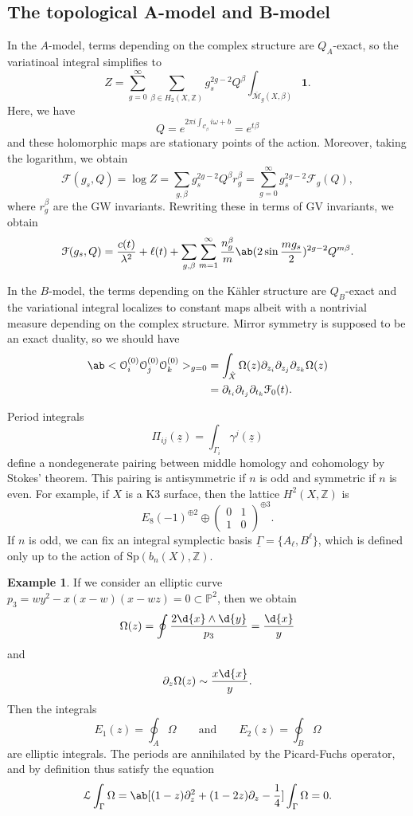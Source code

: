 \documentclass[10pt]{amsart}
\theoremstyle{definition}
\newtheorem{exm}[thm]{Example}
\theoremstyle{remark}
\theoremstyle{plain}
\theoremstyle{definition}
\theoremstyle{remark}
\newcommand{\Z}{\mathbb{Z}}
\renewcommand{\P}{\mathbb{P}}
\newcommand{\Mbar}{\overline{\mathcal{M}}}
\newcommand{\mc}[1]{\mathcal{#1}}
\newcommand{\uz}{\ul{z}}
\newcommand{\mr}[1]{\mathrm{#1}}
\newcommand{\ul}[1]{\underline{#1}}
\newcommand{\1}{\mathbf{1}}
\newcommand{\2}{\mathbf{2}}
\newcommand{\3}{\mathbf{3}}
\begin{document}
\subsection{The topological A-model and B-model}%
\label{sub:The topological A-model}

In the $A$-model, terms depending on the complex structure are $Q_A$-exact, so the variatinoal integral simplifies to
\[ Z = \sum_{g=0}^{\infty} \sum_{\beta \in H_2(X,\Z)} g_s^{2g-2} Q^{\beta} \int_{\Mbar_g(X,\beta)} \1. \]
Here, we have
\[ Q = e^{2\pi i \int_{\mc{C}_{\beta}}i\omega+b} = e^{t\beta} \]
and these holomorphic maps are stationary points of the action. Moreover, taking the logarithm, we obtain
\[ \mc{F}(g_s, Q) = \log Z = \sum_{g,\beta} g_s^{2g-2} Q^{\beta} r_g^{\beta} = \sum_{g=0}^{\infty} g_s^{2g-2} \mc{F}_g(Q), \]
where $r_g^{\beta}$ are the GW invariants.
Rewriting these in terms of GV invariants, we obtain
\[ \mc{F}(g_s, Q) = \frac{c(t)}{\lambda^2} + \ell(t) + \sum_{g,\beta} \sum_{m=1}^{\infty} \frac{n_g^{\beta}}{m}\ab(2 \sin \frac{m g_s}{2})^{2g-2} Q^{m\beta}. \]


In the $B$-model, the terms depending on the K\"ahler structure are $Q_B$-exact and the variational integral localizes to constant maps albeit with a nontrivial measure depending on the complex structure. Mirror symmetry is supposed to be an exact duality, so we should have
\begin{align*}
    \ab<\mc{O}_i^{(0)} \mc{O}_j^{(0)} \mc{O}_k^{(0)}>_{g=0} &= \int_{\hat{X}} \Omega(z) \partial_{z_i} \partial_{z_j} \partial_{z_k} \Omega(z) \\
    &= \partial_{t_i} \partial_{t_j} \partial_{t_k} \mc{F}_0(t).
\end{align*}

Period integrals
\[ \Pi_{ij}(\uz) = \int_{\Gamma_i} \gamma^j(\uz) \]
define a nondegenerate pairing between middle homology and cohomology by Stokes' theorem. This pairing is antisymmetric if $n$ is odd and symmetric if $n$ is even. For example, if $X$ is a K3 surface, then the lattice $H^2(X,\Z)$ is
\[ E_8(-1)^{\oplus 2} \oplus \begin{pmatrix}
    0 & 1 \\
    1 & 0
\end{pmatrix}^{\oplus 3}.
\]
If $n$ is odd, we can fix an integral symplectic basis $\ul{\Gamma} = \{A_{\ell}, B^{\ell}\}$, which is defined only up to the action of $\mr{Sp}(b_n(X), \Z)$.

\begin{exm}
    If we consider an elliptic curve $p_3 = wy^2-x(x-w)(x-wz) = 0 \subset \P^2$, then we obtain
    \[ \Omega(z) = \oint \frac{2 \d{x} \wedge \d{y}}{p_3} = \frac{\d{x}}{y} \]
    and
    \[ \partial_z \Omega(z) \sim \frac{x\d{x}}{y}. \]
    Then the integrals 
    \[ E_1(z) = \oint_A \Omega \qquad \text{and} \qquad E_2(z) = \oint_B \Omega \]
    are elliptic integrals. The periods are annihilated by the Picard-Fuchs operator, and by definition thus satisfy the equation
    \[ \mc{L} \int_{\Gamma} \Omega = \ab[(1-z)\partial_z^2 + (1-2z) \partial_z - \frac{1}{4}] \int_{\Gamma} \Omega = 0. \]
\end{exm}
\end{document}
